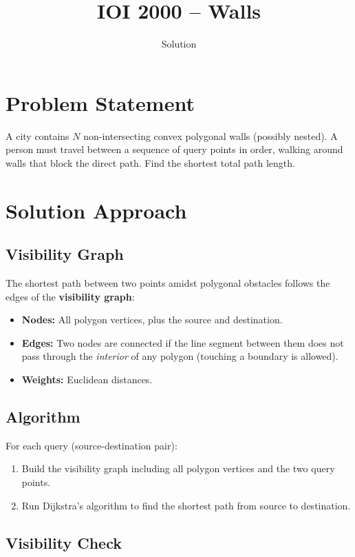 \documentclass[11pt,a4paper]{article}
\title{IOI 2000 -- Walls}
\author{Solution}
\date{}
\begin{document}
\maketitle

\section{Problem Statement}

A city contains $N$ non-intersecting convex polygonal walls (possibly nested).
A person must travel between a sequence of query points in order, walking around
walls that block the direct path. Find the shortest total path length.

\section{Solution Approach}

\subsection{Visibility Graph}

The shortest path between two points amidst polygonal obstacles follows the edges
of the \textbf{visibility graph}:
\begin{itemize}
  \item \textbf{Nodes:} All polygon vertices, plus the source and destination.
  \item \textbf{Edges:} Two nodes are connected if the line segment between them does
        not pass through the \emph{interior} of any polygon (touching a boundary is allowed).
  \item \textbf{Weights:} Euclidean distances.
\end{itemize}

\subsection{Algorithm}

For each query (source-destination pair):
\begin{enumerate}
  \item Build the visibility graph including all polygon vertices and the two query points.
  \item Run Dijkstra's algorithm to find the shortest path from source to destination.
\end{enumerate}

\subsection{Visibility Check}
\end{document}
